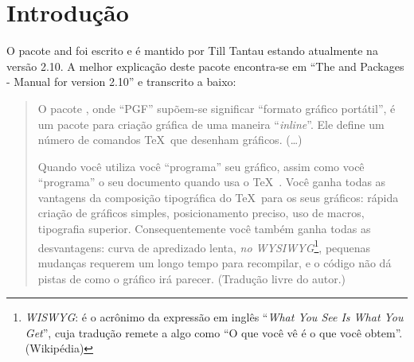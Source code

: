 % 
% 
% 
% 
% 
\chapter{Introdu\c{c}\~{a}o}
O pacote \TikZ and \PGF foi escrito e \'{e} mantido por Till Tantau estando atualmente na vers\~{a}o 2.10. A melhor explica\c{c}\~{a}o deste pacote encontra-se em ``The \TikZ and \PGF Packages - Manual for version 2.10''\nocite{Tantau:2010:Tikz-and-PGF} e transcrito a baixo:
\begin{quote}
    O pacote \PGF, onde ``PGF'' sup\~{o}em-se significar ``formato gr\'{a}fico port\'{a}til'', \'{e} um pacote para cria\c{c}\~{a}o gr\'{a}fica de uma maneira ``\textit{inline}''. Ele define um n\'{u}mero de comandos \TeX \  que desenham gr\'{a}ficos. (\dots)

    Quando voc\^{e} utiliza \PGF voc\^{e} ``programa'' seu gr\'{a}fico, assim como voc\^{e} ``programa'' o seu documento quando usa o \TeX \ . Voc\^{e} ganha todas as vantagens da composi\c{c}\~{a}o tipogr\'{a}fica do \TeX \ para os seus gr\'{a}ficos: r\'{a}pida cria\c{c}\~{a}o de gr\'{a}ficos simples, posicionamento preciso, uso de macros, tipografia superior. Consequentemente voc\^{e} tamb\'{e}m ganha todas as desvantagens: curva de apredizado lenta, \textit{no WYSIWYG}\footnote{\textit{WISWYG}: \'{e} o acr\^{o}nimo da express\~{a}o em ingl\^{e}s ``\textit{What You See Is What You Get}'', cuja tradu\c{c}\~{a}o remete a algo como ``O que voc\^{e} v\^{e} \'{e} o que voc\^{e} obtem''. (Wikip\'{e}dia)}, pequenas mudan\c{c}as requerem um longo tempo para recompilar, e o c\'{o}digo n\~{a}o d\'{a} pistas de como o gr\'{a}fico ir\'{a} parecer. (Tradu\c{c}\~{a}o livre do autor.)
\end{quote}
